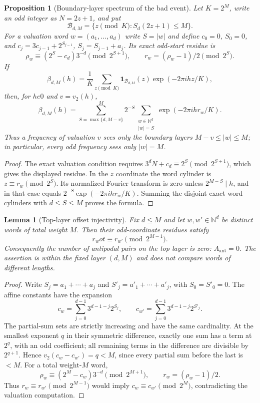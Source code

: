 \documentclass[12pt,a4paper]{article}
\newtheorem{proposition}[theorem]{Proposition}
\newtheorem{lemma}[theorem]{Lemma}
\theoremstyle{remark}
\begin{document}
\begin{proposition}[Boundary-layer spectrum of the bad event]
\label{prop:bad_boundary_spectrum}
Let $K=2^M$, write an odd integer as $N=2z+1$, and put
\[
\mathcal B_{d,M}=\{z\pmod K:S_d(2z+1)\le M\}.
\]
For a valuation word $w=(a_1,\ldots,a_d)$ write $S=|w|$ and define
$c_0=0$, $S_0=0$, and
$c_j=3c_{j-1}+2^{S_{j-1}}$, $S_j=S_{j-1}+a_j$.  Its exact odd-start
residue is
\[
\rho_w\equiv(2^S-c_d)3^{-d}\pmod{2^{S+1}},
\qquad r_w=(\rho_w-1)/2\pmod{2^S}.
\]
If
\[
\beta_{d,M}(h)=\frac1K\sum_{z\pmod K}
\mathbf1_{\mathcal B_{d,M}}(z)\exp(-2\pi i hz/K),
\]
then, for $h
e0$ and $v=v_2(h)$,
\[
\boxed{
\beta_{d,M}(h)=
\sum_{S=\max\{d,M-v\}}^M2^{-S}
\sum_{\substack{w\in\mathbb N^d\\|w|=S}}
\exp(-2\pi i h r_w/K).}
\]
Thus a frequency of valuation $v$ sees only the boundary layers
$M-v\le |w|\le M$; in particular, every odd frequency sees only $|w|=M$.
\end{proposition}
\begin{proof}
The exact valuation condition requires
$3^dN+c_d\equiv2^S\pmod{2^{S+1}}$, which gives the displayed residue.
In the $z$ coordinate the word cylinder is $z\equiv r_w\pmod{2^S}$.
Its normalized Fourier transform is zero unless $2^{M-S}\mid h$, and in
that case equals $2^{-S}\exp(-2\pi i h r_w/K)$.  Summing the disjoint exact
word cylinders with $d\le S\le M$ proves the formula.
\end{proof}
\begin{lemma}[Top-layer offset injectivity]
\label{lem:top_layer_offset_injectivity}
Fix $d\le M$ and let $w,w'\in\mathbb N^d$ be distinct words of total
weight $M$.  Then their odd-coordinate residues satisfy
\[
r_w
ot\equiv r_{w'}\pmod{2^{M-1}}.
\]
Consequently the number of antipodal pairs on the top layer is zero:
$A_{\mathrm{ant}}=0$.  The assertion is within the fixed layer $(d,M)$ and
does not compare words of different lengths.
\end{lemma}
\begin{proof}
Write $S_j=a_1+\cdots+a_j$ and $S'_j=a'_1+\cdots+a'_j$, with
$S_0=S'_0=0$.  The affine constants have the expansion
\[
c_w=\sum_{j=0}^{d-1}3^{d-1-j}2^{S_j},
\qquad
c_{w'}=\sum_{j=0}^{d-1}3^{d-1-j}2^{S'_j}.
\]
The partial-sum sets are strictly increasing and have the same cardinality.
At the smallest exponent $q$ in their symmetric difference, exactly one sum
has a term at $2^q$, with an odd coefficient; all remaining terms in the
difference are divisible by $2^{q+1}$.  Hence
$v_2(c_w-c_{w'})=q<M$, since every partial sum before the last is $<M$.
For a total weight-$M$ word,
\[
\rho_w\equiv(2^M-c_w)3^{-d}\pmod{2^{M+1}},
\qquad r_w=(\rho_w-1)/2.
\]
Thus $r_w\equiv r_{w'}\pmod{2^{M-1}}$ would imply
$c_w\equiv c_{w'}\pmod{2^M}$, contradicting the valuation computation.
\end{proof}
\end{document}
